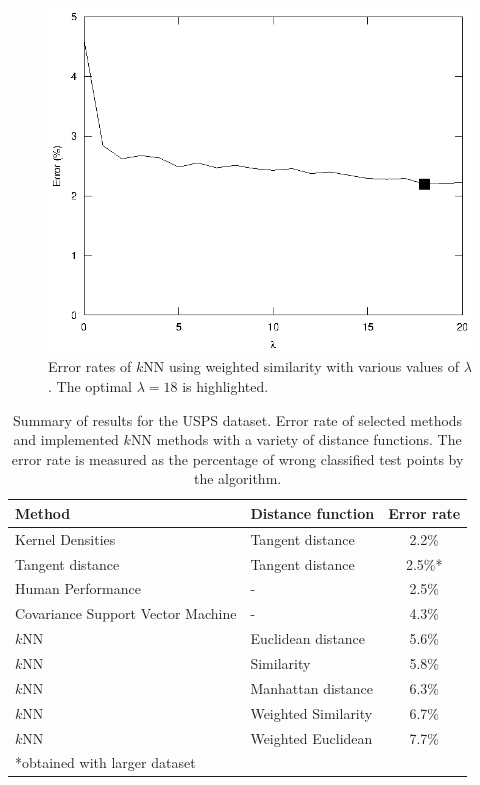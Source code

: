 \documentclass[10pt,twocolumn,letterpaper]{article}
\begin{document}
\begin{figure}[htbp]
	\begin{center}
		\includegraphics[scale=.8]{lambdaSelection}
		\caption{ Error rates of $k$NN using weighted similarity with various values of $\lambda$. The optimal $\lambda=18$ is highlighted.}
		\label{fig:lambda}
	\end{center}
\end{figure}

\begin{table}[htb]
\begin{center}
\begin{tabular}{llc}
\toprule
\bf{Method} & \bf{Distance function} & \bf{Error rate} \\
\midrule
Kernel Densities \cite{keysers} & Tangent distance & 2.2\% \\
Tangent distance \cite{Simard2}& Tangent distance& 2.5\%* \\
Human Performance \cite{Simard} & - & 2.5\%\\
Covariance Support Vector Machine \cite{shivas} & - & 4.3\%\\
$k$NN & Euclidean distance & 5.6\% \\
$k$NN & Similarity  & 5.8\% \\
$k$NN & Manhattan distance & 6.3\% \\
$k$NN & Weighted Similarity  & 6.7\% \\
$k$NN & Weighted Euclidean  & 7.7\% \\
\bottomrule
*obtained with larger dataset
\end{tabular}
\end{center}
\caption{Summary of results for the USPS dataset. Error rate of selected methods and implemented $k$NN methods with a variety of distance functions. The error rate is measured as the percentage of wrong classified test points by the algorithm. }
\label{results}
\end{table}
\end{document}
